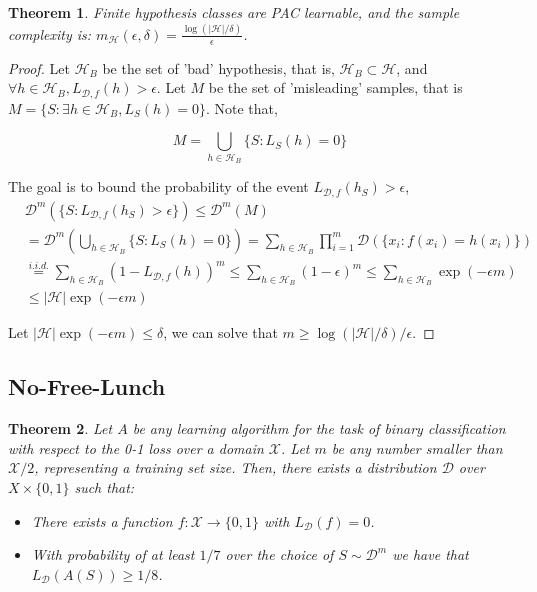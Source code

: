 \documentclass{article}
\newtheorem{theorem}{Theorem}
\newtheorem*{proof}{Proof}
\begin{document}
	\begin{theorem} Finite hypothesis classes are PAC learnable, and the sample complexity is: $m_\mathcal{H}(\epsilon,\delta)=\frac{\log(|\mathcal{H}|/\delta)}{\epsilon}$.
	\end{theorem}
	
	\begin{proof}
	Let $\mathcal{H}_B$ be the set of 'bad' hypothesis, that is, $\mathcal{H}_B\subset\mathcal{H}$, and $\forall h\in\mathcal{H}_B,L_{\mathcal{D},f}(h)>\epsilon$. Let $M$ be the set of 'misleading' samples, that is $M=\{S:\exists h\in \mathcal{H}_B, L_S(h)=0\}$. Note that, 
	
	\begin{equation*}
	M=\bigcup\limits_{h\in\mathcal{H}_B}\{S:L_S(h)=0\}
	\end{equation*}
	
	The goal is to bound the probability of the event $L_{\mathcal{D},f}(h_S)>\epsilon$,
	\begin{equation*}
	\begin{split}
	&\mathcal{D}^m(\{S:L_{\mathcal{D},f}(h_S)>\epsilon\})\leq\mathcal{D}^m(M) \\
	&=\mathcal{D}^m(\bigcup\limits_{h\in\mathcal{H}_B}\{S:L_S(h)=0\})         
	=\sum_{h\in\mathcal{H}_B}\prod_{i=1}^m\mathcal{D}(\{x_i:f(x_i)=h(x_i)\})  \\
	&\overset{i.i.d.}{=}\sum_{h\in\mathcal{H}_B}(1-L_{\mathcal{D},f}(h))^m   
	\leq\sum_{h\in\mathcal{H}_B}(1-\epsilon)^m\leq\sum_{h\in\mathcal{H}_B}\exp(-\epsilon m) \\
	&\leq|\mathcal{H}|\exp(-\epsilon m)
	\end{split}
	\end{equation*}

	Let $|\mathcal{H}|\exp(-\epsilon m)\leq\delta$, we can solve that $m\geq\log(|\mathcal{H}|/\delta)/\epsilon$.
	\end{proof}

\subsection{No-Free-Lunch}

	\begin{theorem}
	Let $A$ be any learning algorithm for the task of binary classification with respect to the 0-1 loss over a domain $\mathcal{X}$. Let $m$ be any number smaller than $\mathcal{X}/2$, representing a training set size. Then, there exists a distribution $\mathcal{D}$ over ${X}\times\{0,1\}$ such that:
	
	\begin{itemize}
	\item There exists a function $f:\mathcal{X}\rightarrow\{0,1\}$ with $L_\mathcal{D}(f)=0$.
	\item With probability of at least $1/7$ over the choice of $S\sim\mathcal{D}^m$ we have that $L_\mathcal{D}(A(S))\geq 1/8$.
	\end{itemize} 
	\end{theorem}
	
\end{document}
